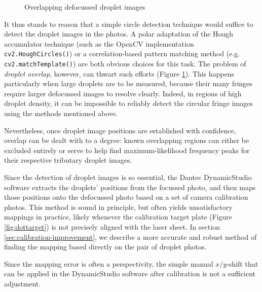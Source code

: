 \documentclass[10pt]{book}
\begin{document}
\begin{figure}
\centering
\caption{Overlapping defocussed droplet images}
\label{fig:droplet-overlap}
\end{figure}

It thus stands to reason that a simple circle detection technique would suffice
to detect the droplet images in the photos. A polar adaptation of the Hough
accumulator technique (such as the OpenCV implementation
\texttt{cv2.HoughCircles()}) or a correlation-based pattern matching method
(e.g. \texttt{cv2.matchTemplate()}) are both obvious choices for this task.  The
problem of \emph{droplet overlap}, however, can thwart such efforts (Figure
\ref{fig:droplet-overlap}). This happens particularly when large droplets are to
be measured, because their many fringes require larger defocussed images to
resolve clearly. Indeed, in regions of high droplet density, it can be impossible
to reliably detect the circular fringe images using the methods mentioned above.

Nevertheless, once droplet image positions are established with confidence, overlap can be
dealt with to a degree: known overlapping regions can either be excluded
entirely or serve to help find maximum-likelihood frequency peaks for their
respective tributary droplet images.

Since the detection of droplet images is so essential, the Dantec DynamicStudio
software extracts the droplets' positions from the focussed photo, and then maps
those positions onto the defocussed photo based on a set of camera calibration
photos. This method is sound in principle, but often yields unsatisfactory
mappings in practice, likely whenever the calibration target plate (Figure
\ref{fig:dottarget}) is not precisely aligned with the laser sheet. In section
\ref{sec:calibration-improvement}, we describe a more accurate and robust method
of finding the mapping based directly on the pair of droplet photos. 

Since the mapping error is often a perspectivity, the simple manual
$x/y$-shift that can be applied in the DynamicStudio software after calibration
is not a sufficient adjustment.
\end{document}
